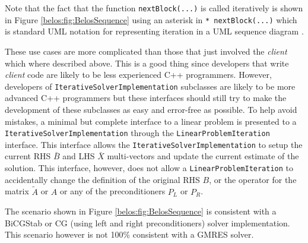 \documentclass[pdf,ps2pdf,11pt]{SANDreport}
\begin{document}
Note that the fact that the function {}\texttt{nextBlock(...)} is
called iteratively is shown in Figure {}\ref{belos:fig:BelosSequence}
using an asterisk in {}\texttt{* nextBlock(...)} which is standard UML
notation for representing iteration in a UML sequence diagram
{}\cite{ref:uml_distilled_2nd_ed}.

These use cases are more complicated than those that just involved the
{}\textit{client} which where described above.  This is a good thing
since developers that write {}\textit{client} code are likely to be
less experienced C++ programmers.  However, developers of
{}\texttt{Iterative\-Solver\-Implementation} subclasses are likely to
be more advanced C++ programmers but these interfaces should still try
to make the development of these subclasses as easy and error-free as
possible.  To help avoid mistakes, a minimal but complete interface to
a linear problem is presented to a
{}\texttt{Iterative\-Solver\-Implementation} through the
{}\texttt{Linear\-Problem\-Iteration} interface.  This interface
allows the {}\texttt{Iterative\-Solver\-Implementation} to setup the
current RHS $\bar{B}$ and LHS $\bar{X}$ multi-vectors and update the
current estimate of the solution.  This interface, however, does not
allow a {}\texttt{Linear\-Problem\-Iteration} to accidentally change
the definition of the original RHS $B$, or the operator for the matrix
$\tilde{A}$ or $A$ or any of the preconditioners $P_L$ or $P_R$.

The scenario shown in Figure {}\ref{belos:fig:BelosSequence} is
consistent with a BiCGStab or CG (using left and right
preconditioners) solver implementation.  This scenario however is not
100\% consistent with a GMRES solver.
\end{document}

